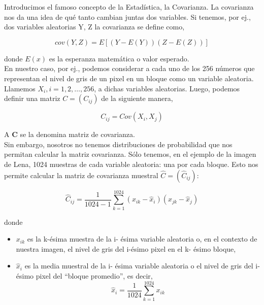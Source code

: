 \documentclass[twocolumn,a4paper,10pt]{article}
\begin{document}
Introducimos el famoso concepto de la Estadística, la Covarianza. La covarianza nos da una idea de qu\'e tanto cambian juntas dos variables. Si tenemos, por ej., 
dos variables aleatorias Y, Z la covarianza se define como,

\begin{equation}
    cov(Y, Z) = E [(Y - E(Y )) (Z - E(Z))]
\end{equation}

donde $E(x)$ es la esperanza matem\'atica o valor esperado. \\

En nuestro caso, por ej., podemos considerar a cada uno de los 256 n\'umeros que representan el nivel de gris de un pixel en un bloque como un variable aleatoria.
Llamemos $X_{i}, i = 1, 2, \dotsc, 256$, a dichas variables aleatorias. Luego, podemos definir una matriz $C = (C_{ij} )$ de la siguiente manera,

\begin{equation}
    C_{ij} = Cov(X_{i}, X_{j})
\end{equation}

A $\textbf{C}$ se la denomina matriz de covarianza.\\

Sin embargo, nosotros no tenemos distribuciones de probabilidad que nos permitan calcular la matriz covarianza. S\'olo tenemos, en el ejemplo de la imagen
de Lena, 1024 muestras de cada variable aleatoria: una por cada bloque. Esto nos permite calcular la matriz de covarianza muestral $\widehat{C} = (\widehat{C}_{ij})$:

\begin{equation}
    \widehat{C}_{ij} =  \frac{1}{1024 - 1}\sum_{k=1}^{1024} (x_{ik} - \widehat{x}_{i}) (x_{jk} - \widehat{x}_{j})
\end{equation}

donde
\begin{itemize}
    \item $x_{ik}$ es la k-\'esima muestra de la i- \'esima variable aleatoria o, en el contexto de nuestra imagen, el nivel de gris del i-\'esimo pixel en el 
    k- \'esimo bloque,
    \item $\widehat{x}_{i}$ es la media muestral de la i- \'esima variable aleatoria o el nivel de gris del i-\'esimo pixel del “bloque promedio”, es decir,
    \[ \widehat{x}_{i} = \frac{1}{1024} \sum_{k=1}^{1024} x_{ik} \]
\end{itemize}

\paragraph*{}
\end{document}
